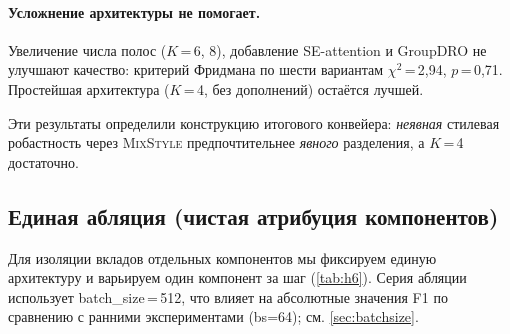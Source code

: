 \documentclass[conference]{IEEEtran}
\newcommand{\mixstyle}{\textsc{MixStyle}}
\begin{document}
\begin{table}[t]
\centering
\caption{Влияние вспомогательных потерь разделения контента/стиля (20 субъектов). Бейзлайн: Sinc FB + \mixstyle{} + CS-головы.}
\label{tab:h4}
\end{table}

\paragraph{Усложнение архитектуры не помогает.}
Увеличение числа полос ($K$\,=\,6, 8), добавление SE-attention и GroupDRO не улучшают качество: критерий Фридмана по шести вариантам $\chi^2$\,=\,2,94, $p$\,=\,0,71.
Простейшая архитектура ($K$\,=\,4, без дополнений) остаётся лучшей.

Эти результаты определили конструкцию итогового конвейера: \emph{неявная} стилевая робастность через \mixstyle{} предпочтительнее \emph{явного} разделения, а $K$\,=\,4 достаточно.

\subsection{Единая абляция (чистая атрибуция компонентов)}
\label{sec:h6}

Для изоляции вкладов отдельных компонентов мы фиксируем единую архитектуру и варьируем один компонент за шаг (\cref{tab:h6}).
Серия абляции использует batch\_size\,=\,512, что влияет на абсолютные значения F1 по сравнению с ранними экспериментами (bs=64); см. \cref{sec:batchsize}.
\end{document}
